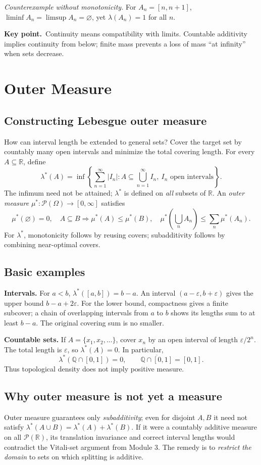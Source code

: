 \documentclass[10pt,a4paper]{article}
\newcommand{\R}{\mathbb R}
\newcommand{\Q}{\mathbb Q}
\newcommand{\key}[1]{\par\smallskip\textcolor{accent}{\textbf{Key point.}}\ #1\par}
\begin{document}
\emph{Counterexample without monotonicity.} For $A_n=[n,n+1]$,
$\liminf A_n=\limsup A_n=\varnothing$, yet $\lambda(A_n)=1$ for all $n$.

\key{Continuity means compatibility with limits. Countable additivity
implies continuity from below; finite mass prevents a loss of mass
``at infinity'' when sets decrease.}

\section{Outer Measure}
\subsection{Constructing Lebesgue outer measure}
How can interval length be extended to general sets? Cover the target
set by countably many open intervals and minimize the total covering
length. For every $A\subseteq\R$, define
\[
\boxed{\lambda^*(A)=\inf\left\{\sum_{n=1}^{\infty}|I_n|:
A\subseteq\bigcup_{n=1}^{\infty}I_n,\ 
I_n\text{ open intervals}\right\}.}
\]
The infimum need not be attained; $\lambda^*$ is defined on
\emph{all} subsets of $\R$. An \emph{outer measure}
$\mu^*:\mathcal P(\Omega)\to[0,\infty]$ satisfies
\[
\boxed{\mu^*(\varnothing)=0,\quad
A\subseteq B\Rightarrow\mu^*(A)\le\mu^*(B),\quad
\mu^*\!\left(\bigcup_n A_n\right)\le\sum_n\mu^*(A_n).}
\]
For $\lambda^*$, monotonicity follows by reusing covers;
subadditivity follows by combining near-optimal covers.

\subsection{Basic examples}
\textbf{Intervals.} For $a<b$, $\lambda^*([a,b])=b-a$. An interval
$(a-\varepsilon,b+\varepsilon)$ gives the upper bound $b-a+2\varepsilon$.
For the lower bound, compactness gives a finite subcover; a chain
of overlapping intervals from $a$ to $b$ shows its lengths sum to at least
$b-a$. The original covering sum is no smaller.

\textbf{Countable sets.} If $A=\{x_1,x_2,\ldots\}$, cover $x_n$ by an
open interval of length $\varepsilon/2^n$. The total length is
$\varepsilon$, so $\lambda^*(A)=0$. In particular,
\[
\boxed{\lambda^*(\Q\cap[0,1])=0,\qquad
\overline{\Q\cap[0,1]}=[0,1].}
\]
Thus topological density does not imply positive measure.

\subsection{Why outer measure is not yet a measure}
Outer measure guarantees only \emph{subadditivity}; even for disjoint
$A,B$ it need not satisfy $\lambda^*(A\cup B)=\lambda^*(A)+\lambda^*(B)$.
If it were a countably additive measure on all $\mathcal P(\R)$,
its translation invariance and correct interval lengths would
contradict the Vitali-set argument from Module 3. The remedy is to
\emph{restrict the domain} to sets on which splitting is additive.
\end{document}

